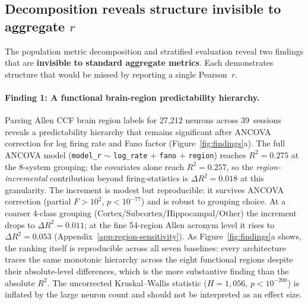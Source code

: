 \documentclass{article}
\begin{document}
\subsection{Decomposition reveals structure invisible to aggregate $r$}
\label{sec:findings}

The population metric decomposition and stratified evaluation reveal
two findings that are \textbf{invisible to standard aggregate
metrics}.  Each demonstrates structure that would be missed by
reporting a single Pearson~$r$.

\paragraph{Finding 1: A functional brain-region predictability hierarchy.}
\label{sec:regions}
Parsing Allen CCF brain region labels for 27{,}212 neurons across
39~sessions reveals a predictability hierarchy that remains
significant after ANCOVA correction for log firing rate and Fano
factor (Figure~\ref{fig:findings}a).  The full ANCOVA model
(\texttt{model\_r} $\sim$ \texttt{log\_rate} $+$ \texttt{fano} $+$
\texttt{region}) reaches $R^{2}{=}0.275$ at the 8-system grouping; the
covariates alone reach $R^{2}{=}0.257$, so the \emph{region-incremental}
contribution beyond firing-statistics is $\Delta R^{2}{=}0.018$ at this
granularity.  The increment is modest but reproducible: it survives
ANCOVA correction (partial $F{>}10^{2}$, $p < 10^{-77}$) and is
robust to grouping choice.  At a coarser 4-class grouping
(Cortex/Subcortex/Hippocampal/Other) the increment drops to
$\Delta R^{2}{=}0.011$; at the fine 54-region Allen acronym level it
rises to $\Delta R^{2}{=}0.053$ (Appendix~\ref{app:region-sensitivity}).
As Figure~\ref{fig:findings}a shows, the ranking itself is
reproducible across all seven baselines: every architecture traces
the same monotonic hierarchy across the eight functional regions
despite their absolute-level differences, which is the more
substantive finding than the absolute $R^{2}$.  The
uncorrected Kruskal--Wallis statistic ($H{=}1{,}056$, $p < 10^{-200}$)
is inflated by the large neuron count and should not be interpreted
as an effect size.
\end{document}
